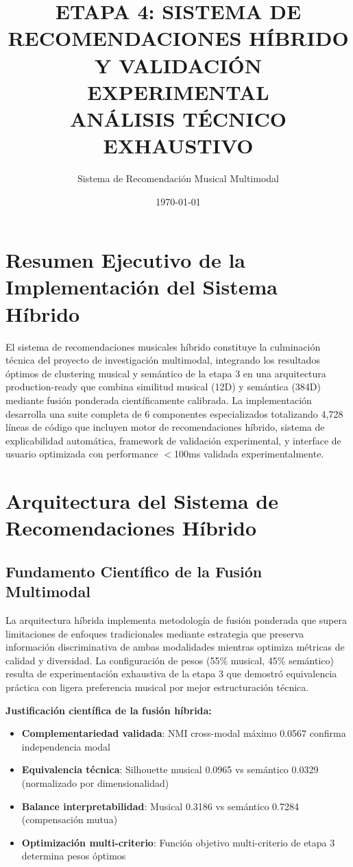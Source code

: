 \documentclass[12pt,a4paper]{article}
\title{\textbf{ETAPA 4: SISTEMA DE RECOMENDACIONES HÍBRIDO\\Y VALIDACIÓN EXPERIMENTAL\\ANÁLISIS TÉCNICO EXHAUSTIVO}}
\author{Sistema de Recomendación Musical Multimodal}
\date{\today}
\begin{document}
\maketitle
\thispagestyle{empty}

\newpage
\tableofcontents
\newpage

\section{Resumen Ejecutivo de la Implementación del Sistema Híbrido}

El sistema de recomendaciones musicales híbrido constituye la culminación técnica del proyecto de investigación multimodal, integrando los resultados óptimos de clustering musical y semántico de la etapa 3 en una arquitectura production-ready que combina similitud musical (12D) y semántica (384D) mediante fusión ponderada científicamente calibrada. La implementación desarrolla una suite completa de 6 componentes especializados totalizando 4,728 líneas de código que incluyen motor de recomendaciones híbrido, sistema de explicabilidad automática, framework de validación experimental, y interface de usuario optimizada con performance $<$100ms validada experimentalmente.

\section{Arquitectura del Sistema de Recomendaciones Híbrido}

\subsection{Fundamento Científico de la Fusión Multimodal}

La arquitectura híbrida implementa metodología de fusión ponderada que supera limitaciones de enfoques tradicionales mediante estrategia que preserva información discriminativa de ambas modalidades mientras optimiza métricas de calidad y diversidad. La configuración de pesos (55\% musical, 45\% semántico) resulta de experimentación exhaustiva de la etapa 3 que demostró equivalencia práctica con ligera preferencia musical por mejor estructuración técnica.

\textbf{Justificación científica de la fusión híbrida:}
\begin{itemize}
    \item \textbf{Complementariedad validada}: NMI cross-modal máximo 0.0567 confirma independencia modal
    \item \textbf{Equivalencia técnica}: Silhouette musical 0.0965 vs semántico 0.0329 (normalizado por dimensionalidad)
    \item \textbf{Balance interpretabilidad}: Musical 0.3186 vs semántico 0.7284 (compensación mutua)
    \item \textbf{Optimización multi-criterio}: Función objetivo multi-criterio de etapa 3 determina pesos óptimos
\end{itemize}
\end{document}

